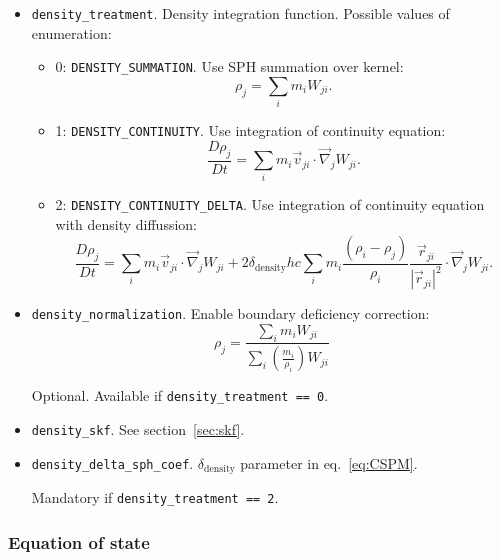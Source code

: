 \begin{itemize}
    \item \verb|density_treatment|. Density integration function. Possible values of enumeration:
    \begin{itemize}
        \item 0: \verb|DENSITY_SUMMATION|. Use SPH summation over kernel:
        \begin{equation}
            \rho_{j} = \sum\limits_{i} m_{i} W_{ji}.
        \end{equation}

        \item 1: \verb|DENSITY_CONTINUITY|. Use integration of continuity equation:
        \begin{equation}
            \frac{D\rho_{j}}{Dt} = \sum\limits_{i} m_{i} \vec{v}_{ji} \cdot \vec{\nabla}_{j} W_{ji}.
        \end{equation}

        \item 2: \verb|DENSITY_CONTINUITY_DELTA|. Use integration of continuity equation with density diffussion:
        \begin{equation}\label{eq:CSPM}
             \frac{D\rho_{j}}{Dt} = \sum\limits_{i} m_{i} \vec{v}_{ji} \cdot \vec{\nabla}_{j} W_{ji} + 
             2\delta_{\text{density}} h c
             \sum\limits_{i}m_{i} \frac{(\rho_{i} - \rho_{j})}{\rho_{i}} \frac{\vec{r}_{ji}}{|\vec{r}_{ji}|^2} \cdot \vec{\nabla}_{j} W_{ji}.
        \end{equation}
    \end{itemize}

    \item \verb|density_normalization|. Enable boundary deficiency correction:
    \begin{equation}
        \rho_{j} = \frac{
        \sum\limits_{i}m_{i}W_{ji}
        }{
        \sum\limits_{i}
        \left(\frac{m_{i}}{\rho_{i}}\right) W_{ji}
        }
    \end{equation}

    Optional. Available if \verb|density_treatment == 0|.
    \item \verb|density_skf|. See section~\ref{sec:skf}.
    \item \verb|density_delta_sph_coef|. $\delta_{\text{density}}$ parameter in eq.~\ref{eq:CSPM}.
    
    Mandatory if \verb|density_treatment == 2|.
\end{itemize}

\subsubsection{Equation of state}

